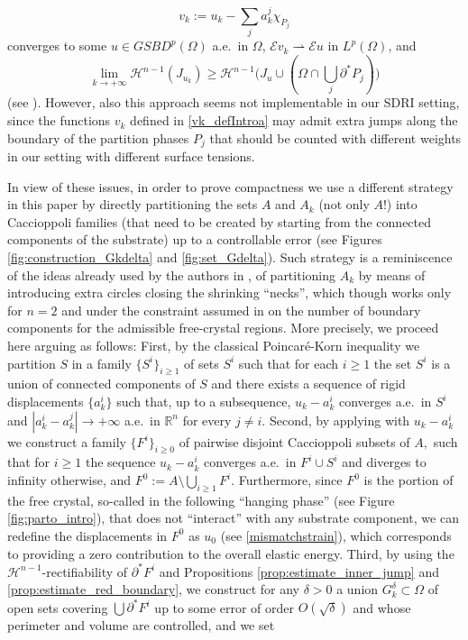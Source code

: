 \documentclass[reqno]{amsart}
\numberwithin{equation}{section}
\theoremstyle{plain}
\theoremstyle{definition}
\newcommand{\R}{\mathbb{R}}
\newcommand{\cH}{\mathcal{H}}
\newcommand{\p}{\partial}
\newcommand{\wk}{\rightharpoonup}
\newcommand{\str}[1]{\mathcal{E}#1}
\begin{document}
\begin{equation}\label{vk_defIntroa}
v_k:=u_k - \sum\limits_j a_k^j\chi_{P_j} 
\end{equation}
converges to some $u\in GSBD^p(\Omega)$ a.e.\ in $\Omega$, $\str{v_k}\wk \str{u}$ in $L^p(\Omega)$, and 
$$
\lim\limits_{k\to+\infty} \cH^{n-1}(J_{u_k}) \ge \cH^{n-1}\Big(J_u\cup(\Omega\cap \bigcup_j \p^*P_j)\Big)
$$
(see \cite[Theorem 1.1]{ChC:2020_arxiv}). However, also this approach seems not implementable in our SDRI setting, since the functions $v_k$ defined in \eqref{vk_defIntroa} may admit extra jumps along the boundary of the partition phases $P_j$ that should be counted with different weights in our setting with different surface tensions. 

In view of these  issues, in order to prove compactness we use a different strategy in this  paper by directly partitioning the sets $A$ and $A_k$ (not only $A$!) into Caccioppoli families (that need to be created by starting from the connected components of the substrate) up to a controllable error (see Figures \ref{fig:construction_Gkdelta} and \ref{fig:set_Gdelta}). Such strategy is a reminiscence of the ideas already used by the authors  in \cite[Theorem 2.7]{HP:2020_arma}, of partitioning $A_k$  by means of introducing extra circles closing the shrinking ``necks'', which though works only for $n=2$ and under the constraint assumed in  \cite{HP:2020_arma} on the number of boundary components for the admissible free-crystal regions. More precisely, we proceed here arguing as follows: First,  by  the classical Poincar\'e-Korn inequality we partition $S$ in a family $\{S^i\}_{i\geq1}$ of sets $S^i$ such that for each $i\geq1$ the set $S^i$ is a union of connected components of $S$ and  there exists a sequence of rigid displacements $\{a_k^i\}$ such that, up to a subsequence, $u_k - a_k^i $ converges a.e.\ in $S^i$ and  $|a_k^i - a_k^j|\to+\infty$ a.e.\ in $\R^n$ for every $j\neq i$. Second, by applying \cite[Theorem 1.1]{ChC:2020_jems} with $u_k-a_k^i$ we construct a family $\{F^i\}_{i\geq0}$ of pairwise disjoint Caccioppoli subsets of $A,$ such that for $i\geq1$ the sequence $u_k-a_k^i$ converges a.e.\ in $F^i\cup S^i$ and diverges to infinity otherwise, and $F^0:=A\setminus\bigcup_{i\ge1} F^i$. Furthermore, since $F^0$ is the portion of the free crystal, so-called in the following ``hanging phase'' (see Figure \ref{fig:parto_intro}), that does not ``interact'' with any substrate component, we can redefine the displacements  in $F^0$ as $u_0$ (see \eqref{mismatchstrain}), which corresponds to providing a zero contribution to the overall elastic energy. Third, by using the $\cH^{n-1}$-rectifiability of $\p^*F^i$ and Propositions \ref{prop:estimate_inner_jump} and \ref{prop:estimate_red_boundary}, we construct for any $\delta>0$ a union $G_k^\delta\subset\Omega$ of open sets covering $\bigcup \p^*F^i$ up to some error of order $O(\sqrt{\delta})$ and whose perimeter and volume are controlled, and we set 
\end{document}
